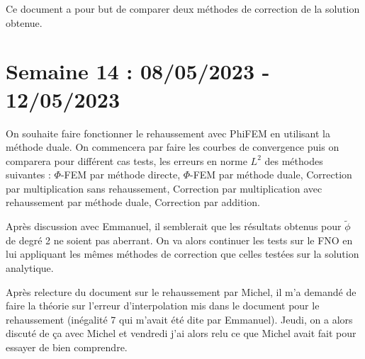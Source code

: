 \documentclass[french]{article}
\begin{document}
	Ce document a pour but de comparer deux méthodes de correction de la solution obtenue.
\section{Semaine 14 : 08/05/2023 - 12/05/2023}
	On souhaite faire fonctionner le rehaussement avec PhiFEM en utilisant la méthode duale. On commencera par faire les courbes de convergence puis on comparera pour différent cas tests, les erreurs en norme $L^2$ des méthodes suivantes : $\Phi$-FEM par méthode directe, $\Phi$-FEM par méthode duale, Correction par multiplication sans rehaussement, Correction par multiplication avec rehaussement par méthode duale, Correction par addition.
	
	Après discussion avec Emmanuel, il semblerait que les résultats obtenus pour $\tilde{\phi}$ de degré 2 ne soient pas aberrant. On va alors continuer les tests sur le FNO en lui appliquant les mêmes méthodes de correction que celles testées sur la solution analytique.
	
	Après relecture du document sur le rehaussement par Michel, il m'a demandé de faire la théorie sur l'erreur d'interpolation mis dans le document pour le rehaussement (inégalité 7 qui m'avait été dite par Emmanuel). Jeudi, on a alors discuté de ça avec Michel et vendredi j'ai alors relu ce que Michel avait fait pour essayer de bien comprendre.
\end{document}
